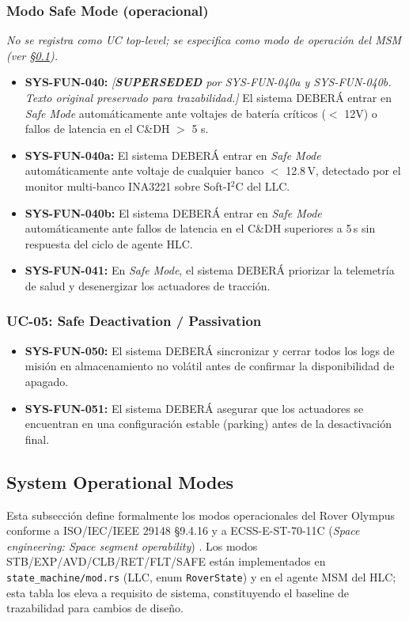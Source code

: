 \subsubsection{Modo Safe Mode (operacional)}
\emph{No se registra como UC top-level; se especifica como modo de operación del MSM (ver \S\ref{subsec:op_modes}).}
\begin{itemize}
    \item \textbf{SYS-FUN-040:} \textit{[\textbf{SUPERSEDED} por SYS-FUN-040a y SYS-FUN-040b. Texto original preservado para trazabilidad.]} El sistema DEBERÁ entrar en \emph{Safe Mode} automáticamente ante voltajes de batería críticos ($<$ 12V) o fallos de latencia en el C\&DH $>$ 5 s.
    \item \textbf{SYS-FUN-040a:} El sistema DEBERÁ entrar en \emph{Safe Mode} automáticamente ante voltaje de cualquier banco $<$ 12.8\,V, detectado por el monitor multi-banco INA3221 sobre Soft-I$^2$C del LLC.
    \item \textbf{SYS-FUN-040b:} El sistema DEBERÁ entrar en \emph{Safe Mode} automáticamente ante fallos de latencia en el C\&DH superiores a 5\,s sin respuesta del ciclo de agente HLC.
    \item \textbf{SYS-FUN-041:} En \emph{Safe Mode}, el sistema DEBERÁ priorizar la telemetría de salud y desenergizar los actuadores de tracción.
\end{itemize}

\subsubsection{UC-05: Safe Deactivation / Passivation}
\begin{itemize}
    \item \textbf{SYS-FUN-050:} El sistema DEBERÁ sincronizar y cerrar todos los logs de misión en almacenamiento no volátil antes de confirmar la disponibilidad de apagado.
    \item \textbf{SYS-FUN-051:} El sistema DEBERÁ asegurar que los actuadores se encuentran en una configuración estable (parking) antes de la desactivación final.
\end{itemize}

\subsection{System Operational Modes}\label{subsec:op_modes}

Esta subsección define formalmente los modos operacionales del Rover Olympus conforme a ISO/IEC/IEEE 29148 §9.4.16 y a ECSS-E-ST-70-11C (\textit{Space engineering: Space segment operability}) \cite{ecss_e_st_70_11c}. Los modos STB/EXP/AVD/CLB/RET/FLT/SAFE están implementados en \texttt{state\_machine/mod.rs} (LLC, enum \texttt{RoverState}) y en el agente MSM del HLC; esta tabla los eleva a requisito de sistema, constituyendo el baseline de trazabilidad para cambios de diseño.

